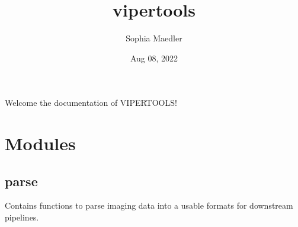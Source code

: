 \documentclass[a4paper,10pt,english,openany,oneside]{sphinxmanual}
\title{vipertools}
\date{Aug 08, 2022}
\author{Sophia Maedler}
\begin{document}
\pagestyle{empty}
\sphinxmaketitle
\pagestyle{plain}
\sphinxtableofcontents
\pagestyle{normal}
\label{\detokenize{index::doc}}


\sphinxAtStartPar
Welcome the documentation of VIPERTOOLS!


\chapter{Modules}
\label{\detokenize{pages/modules:module-vipertools.parse}}\label{\detokenize{pages/modules:modules}}\label{\detokenize{pages/modules::doc}}

\section{parse}
\label{\detokenize{pages/modules:parse}}
\sphinxAtStartPar
Contains functions to parse imaging data into a usable formats for downstream pipelines.
\end{document}
